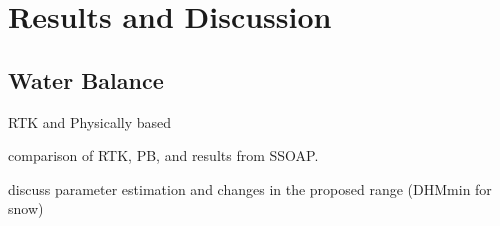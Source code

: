 \chapter{Results and Discussion}

\section{Water Balance}

RTK and Physically based

comparison of RTK, PB, and results from SSOAP.



discuss parameter estimation and changes in the proposed range (DHMmin for snow)